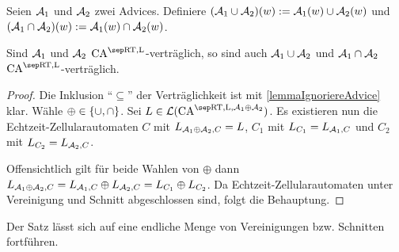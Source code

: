 \begin{satz}
    Seien $\mathcal{A}_1$ und $\mathcal{A}_2$ zwei Advices.
    Definiere $(\mathcal{A}_1 \cup \mathcal{A}_2)(w) := \mathcal{A}_1(w) \cup \mathcal{A}_2(w)$ und 
    $(\mathcal{A}_1 \cap \mathcal{A}_2)(w) := \mathcal{A}_1(w) \cap \mathcal{A}_2(w)$.
    
    Sind $\mathcal{A}_1$ und $\mathcal{A}_2$ $\CAM{\CART, \CALeft}$-verträglich, so sind
    auch $\mathcal{A}_1 \cup \mathcal{A}_2$ und $\mathcal{A}_1 \cap \mathcal{A}_2$
    $\CAM{\CART, \CALeft}$-verträglich.
\end{satz}
\begin{proof}
    Die Inklusion \enquote{$\subseteq$} der Verträglichkeit ist mit \cref{lemmaIgnoriereAdvice} klar.
    Wähle $\mathbin{\oplus} \in \{ { \cup, \cap } \}$.
    Sei $L \in \CAL{\CART, \CALeft, \advA_1 \mathbin{\oplus} \advA_2}$.
    Es existieren nun die Echtzeit-Zellularautomaten $C$ mit $L_{\mathcal{A}_1 \mathbin{\oplus} \mathcal{A}_2, C} = L$, $C_1$ mit $L_{C_1} = L_{\mathcal{A}_1, C}$ und $C_2$ mit $L_{C_2} = L_{\mathcal{A}_2, C}$.
    
    Offensichtlich gilt für beide Wahlen von $\mathbin{\oplus}$ dann
    $L_{\mathcal{A}_1 \mathbin{\oplus} \mathcal{A}_2, C} = L_{\mathcal{A}_1, C} \mathbin{\oplus} L_{\mathcal{A}_2, C} = L_{C_1} \mathbin{\oplus} L_{C_2}$.
    Da Echtzeit-Zellularautomaten unter Vereinigung und Schnitt abgeschlossen sind, folgt die Behauptung.
\end{proof}

Der Satz lässt sich auf eine endliche Menge von Vereinigungen \acs{bzw.} Schnitten fortführen.

\begin{comment}
    \begin{satz}
        Sei $(\Sigma \cup \finset{\Box}) ^2 \subseteq \Gamma, \Box \not\in \Sigma$.
        
        \begin{enumerate}
            \item  $\advA_1(w) := \Gamma^{|w|}$
        \end{enumerate}
        
        Es gilt jeweils:
        \[
            \CAL{\CART, \orakel({\advA_i})} = \CAL{\CALT, \orakel({\advA_i})}
        \]
        
    \end{satz}

    \begin{definition}
        Seien $\advA_1$ und $\advA_2$ zwei Orakel, $M \subseteq \ECA$ (falls nicht angegeben, $M := \ECA^\CART$).
        \[
            \advA_1 \leq_M \advA_2 \; :\Leftrightarrow \; \mathcal{L}(M^{\orakel(\advA_1)}) \subseteq \mathcal{L}(M^{\orakel(\advA_2)})
        \]        
    \end{definition}
    
    \begin{lemma}
        Es gibt kein maximales Orakel.
    \end{lemma}
    
\end{comment}

